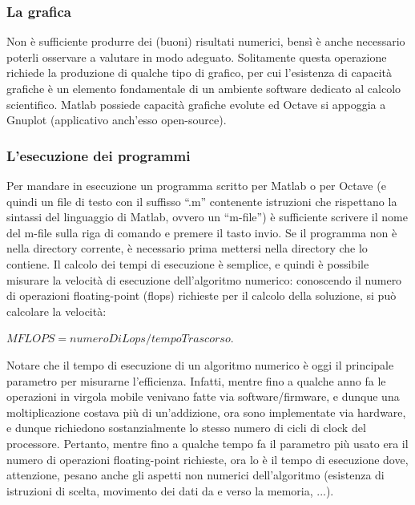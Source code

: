 \subsubsection{La grafica}

Non è sufficiente produrre dei (buoni) risultati numerici, bensì è anche necessario poterli osservare a valutare in modo adeguato. Solitamente questa operazione richiede la produzione di qualche tipo di grafico, per cui l’esistenza di capacità grafiche è un elemento fondamentale di un ambiente software dedicato al calcolo scientifico. Matlab possiede capacità grafiche evolute ed Octave si appoggia a Gnuplot (applicativo anch’esso open-source).

\subsubsection{L’esecuzione dei programmi}

Per mandare in esecuzione un programma scritto per Matlab o per Octave (e quindi un file di testo con il suffisso ``.m'' contenente istruzioni che rispettano la sintassi del linguaggio di Matlab, ovvero un ``m-file'') è sufficiente scrivere il nome del m-file sulla riga di comando e premere il tasto invio. Se il programma non è nella directory corrente, è necessario prima mettersi nella directory che lo contiene.
Il calcolo dei tempi di esecuzione è semplice, e quindi è possibile misurare la velocità di esecuzione dell’algoritmo numerico: conoscendo il numero di operazioni floating-point (flops) richieste per il calcolo della soluzione, si può calcolare la velocità:

\begin{center} 

$MFLOPS = numeroDiLops / tempoTrascorso$.

\end{center}

Notare che il tempo di esecuzione di un algoritmo numerico è oggi il principale parametro per misurarne l'efficienza. Infatti, mentre fino a qualche anno fa le operazioni in virgola mobile venivano fatte via software/firmware, e dunque una moltiplicazione costava più di un'addizione, ora sono implementate via hardware, e dunque richiedono sostanzialmente lo stesso numero di cicli di clock del processore. Pertanto, mentre fino a qualche tempo fa il parametro più usato era il numero di operazioni floating-point richieste, ora lo è il tempo di esecuzione dove, attenzione, pesano anche gli aspetti non numerici dell'algoritmo (esistenza di istruzioni di scelta, movimento dei dati da e verso la memoria, ...).

